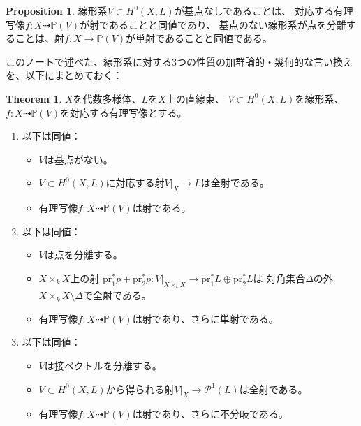 \documentclass[uplatex]{jsarticle}
\theoremstyle{definition}
\newtheorem{thm}{Theorem}[section]
\newtheorem{prop}[prop]{Proposition}
\renewcommand{\P}{\mathbb{P}}
\newcommand{\mcP}{\mathcal{P}}
\newcommand{\dto}{\dashrightarrow}
\begin{document}
\begin{prop}
  線形系\(V\subset H^0(X,L)\)が基点なしであることは、
  対応する有理写像\(f:X\dto \P(V)\)が射であることと同値であり、
  基点のない線形系が点を分離することは、射\(f:X\to \P(V)\)が単射であることと同値である。
\end{prop}

このノートで述べた、線形系に対する3つの性質の加群論的・幾何的な言い換えを、以下にまとめておく：

\begin{thm}\label{thm}
  \(X\)を代数多様体、\(L\)を\(X\)上の直線束、
  \(V\subset H^0(X,L)\)を線形系、
  \(f:X\dto \P(V)\)を対応する有理写像とする。
  \begin{enumerate}
    \item
    以下は同値：
    \begin{itemize}
      \item
      \(V\)は基点がない。
      \item
      \(V\subset H^0(X,L)\)に対応する射\(V|_X\to L\)は全射である。
      \item
      有理写像\(f:X\dto\P(V)\)は射である。
    \end{itemize}
    \item
    以下は同値：
    \begin{itemize}
      \item
      \(V\)は点を分離する。
      \item
      \(X\times_kX\)上の射
      \(\mathrm{pr}_1^*p+\mathrm{pr}_2^*p:V|_{X\times_kX}\to
      \mathrm{pr}_1^*L\oplus \mathrm{pr}_2^*L\)は
      対角集合\(\Delta\)の外\(X\times_kX\setminus \Delta\)で全射である。
      \item
      有理写像\(f:X\dto\P(V)\)は射であり、さらに単射である。
    \end{itemize}
    \item
    以下は同値：
    \begin{itemize}
      \item
      \(V\)は接ベクトルを分離する。
      \item
      \(V\subset H^0(X,L)\)から得られる射\(V|_X\to \mcP^1(L)\)は全射である。
      \item
      有理写像\(f:X\dto\P(V)\)は射であり、さらに不分岐である。
    \end{itemize}
  \end{enumerate}
\end{thm}
\end{document}
